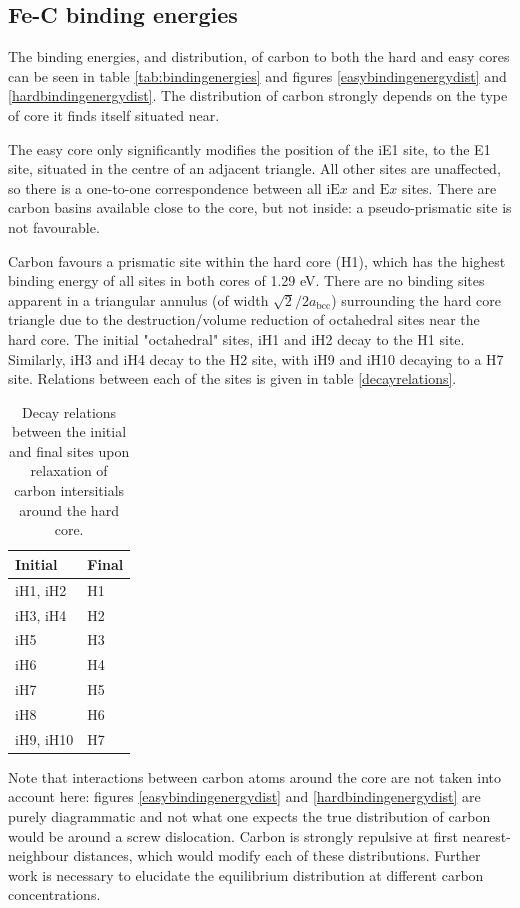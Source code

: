 \documentclass[a4paper,11pt]{article}
\begin{document}
\subsection{Fe-C binding energies}
\label{sec:org997b4e9}

The binding energies, and distribution, of carbon to both the hard and easy cores can be seen in table
\ref{tab:bindingenergies} and figures \ref{easybindingenergydist} and \ref{hardbindingenergydist}. The
distribution of carbon strongly depends on the type of core it finds itself situated near. 

The easy core only significantly modifies the position of the iE1 site, to the E1 site, situated
in the centre of an adjacent triangle. All other sites are unaffected, so there is a one-to-one
correspondence between all \(\text{iE}x\) and \(\text{E}x\) sites. There are carbon basins available
close to the core, but not inside: a pseudo-prismatic site is not favourable.

Carbon favours a prismatic site within the hard core (H1), which has the highest
binding energy of all sites in both cores of 1.29 eV. There are no binding sites apparent in a triangular
annulus (of width \(\sqrt{2}/2 a_{\text{bcc}}\)) surrounding the hard core triangle due to the
destruction/volume reduction of octahedral sites near the hard core. The initial "octahedral"
sites, iH1 and iH2 decay to the H1 site. Similarly, iH3 and iH4 decay to the H2 site, with iH9
and iH10 decaying to a H7 site. Relations between each of the sites is given in table
\ref{decayrelations}.

\begin{table}[htbp]
\caption{\label{tab:org8d275ce}
Decay relations between the initial and final sites upon relaxation of carbon intersitials around the hard core.}
\centering
\begin{tabular}{ll}
Initial & Final\\
\hline
iH1, iH2 & H1\\
iH3, iH4 & H2\\
iH5 & H3\\
iH6 & H4\\
iH7 & H5\\
iH8 & H6\\
iH9, iH10 & H7\\
\end{tabular}
\end{table}


Note that interactions between carbon atoms around the core are not taken into account here:
figures \ref{easybindingenergydist} and \ref{hardbindingenergydist} are purely diagrammatic and not
what one expects the true distribution of carbon would be around a screw dislocation. Carbon is strongly
repulsive at first nearest-neighbour distances, which would modify each of these
distributions. Further work is necessary to elucidate the equilibrium distribution at different
carbon concentrations. 
\end{document}
